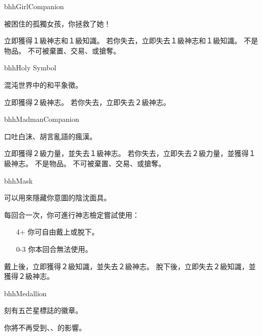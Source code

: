 \linebreak[0]%
\begin{OmenCard}{bhh}{Girl}{Companion}
	\begin{CardStory}
		被困住的孤獨女孩，你拯救了她！
	\end{CardStory}
	立即獲得１級神志和１級知識。\smallbreak
	若你失去\ThisName{}，立即失去１級神志和１級知識。\smallbreak
	\ThisName{}不是物品。\smallbreak
	\ThisName{}不可被棄置、交易、或搶奪。\smallbreak
\end{OmenCard}%
\linebreak[0]%
\begin{OmenCard}{bhh}{Holy Symbol}{}
	\begin{CardStory}
		混沌世界中的和平象徵。
	\end{CardStory}
	立即獲得２級神志。\smallbreak
	若你失去\ThisName{}，立即失去２級神志。\smallbreak
\end{OmenCard}%
\linebreak[0]%
\begin{OmenCard}{bhh}{Madman}{Companion}
	\begin{CardStory}
		口吐白沫、胡言亂語的瘋漢。
	\end{CardStory}
	立即獲得２級力量，並失去１級神志。\smallbreak
	若你失去\ThisName{}，立即失去２級力量，並獲得１級神志。\smallbreak
	\ThisName{}不是物品。\smallbreak
	\ThisName{}不可被棄置、交易、或搶奪。\smallbreak
\end{OmenCard}%
\linebreak[0]%
\begin{OmenCard}{bhh}{Mask}{}
	\begin{CardStory}
		可以用來隱藏你意圖的陰沈面具。
	\end{CardStory}
	每回合一次，你可進行神志檢定嘗試使用\ThisName{}：
	\begin{itemize}
		\item[4+] 你可自由戴上或脫下\ThisName{}。
		\item[0-3] 你本回合無法使用\ThisName{}。
	\end{itemize}
	戴上\ThisName{}後，立即獲得２級知識，並失去２級神志。\smallbreak
	脫下\ThisName{}後，立即失去２級知識，並獲得２級神志。\smallbreak
\end{OmenCard}%
\linebreak[0]%
\begin{OmenCard}{bhh}{Medallion}{}
	\begin{CardStory}
		刻有五芒星標誌的徽章。
	\end{CardStory}
	你將不再受到、、的影響。\smallbreak
\end{OmenCard}%
